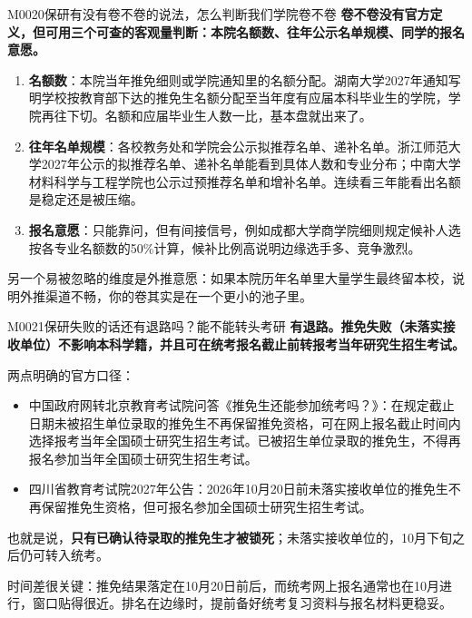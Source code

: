 \begin{qa}{M0020}{保研有没有卷不卷的说法，怎么判断我们学院卷不卷}
\textbf{卷不卷没有官方定义，但可用三个可查的客观量判断：本院名额数、往年公示名单规模、同学的报名意愿。}

\begin{enumerate}
  \item \textbf{名额数}：本院当年推免细则或学院通知里的名额分配。湖南大学2027年通知写明学校按教育部下达的推免生名额分配至当年度有应届本科毕业生的学院，学院再往下切。名额和应届毕业生人数一比，基本盘就出来了。
  \item \textbf{往年名单规模}：各校教务处和学院会公示拟推荐名单、递补名单。浙江师范大学2027年公示的拟推荐名单、递补名单能看到具体人数和专业分布；中南大学材料科学与工程学院也公示过预推荐名单和增补名单。连续看三年能看出名额是稳定还是被压缩。
  \item \textbf{报名意愿}：只能靠问，但有间接信号，例如成都大学商学院细则规定候补人选按各专业名额数的50\%计算，候补比例高说明边缘选手多、竞争激烈。
\end{enumerate}

另一个易被忽略的维度是外推意愿：如果本院历年名单里大量学生最终留本校，说明外推渠道不畅，你的卷其实是在一个更小的池子里。
\end{qa}

\begin{qa}{M0021}{保研失败的话还有退路吗？能不能转头考研}
\textbf{有退路。推免失败（未落实接收单位）不影响本科学籍，并且可在统考报名截止前转报考当年研究生招生考试。}

两点明确的官方口径：

\begin{itemize}
  \item 中国政府网转北京教育考试院问答《推免生还能参加统考吗？》：在规定截止日期未被招生单位录取的推免生不再保留推免资格，可在网上报名截止时间内选择报考当年全国硕士研究生招生考试。已被招生单位录取的推免生，不得再报名参加当年全国硕士研究生招生考试。
  \item 四川省教育考试院2027年公告：2026年10月20日前未落实接收单位的推免生不再保留推免生资格，但可报名参加全国硕士研究生招生考试。
\end{itemize}

也就是说，\textbf{只有已确认待录取的推免生才被锁死}；未落实接收单位的，10月下旬之后仍可转入统考。

时间差很关键：推免结果落定在10月20日前后，而统考网上报名通常也在10月进行，窗口贴得很近。排名在边缘时，提前备好统考复习资料与报名材料更稳妥。
\end{qa}

